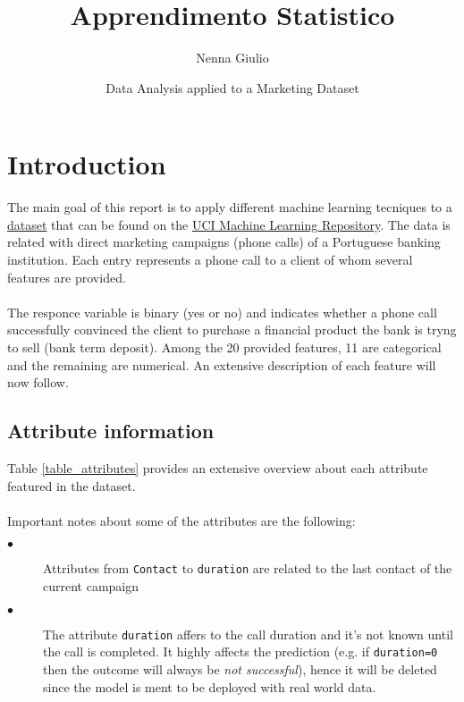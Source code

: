 \documentclass{article}
\title{Apprendimento Statistico}
\author{Nenna Giulio}
\date{Data Analysis applied to a Marketing Dataset}
\numberwithin{equation}{section}
\theoremstyle{definition}
\theoremstyle{plain}
\theoremstyle{definition}
\theoremstyle{remark}
\begin{document}
\maketitle
\section{Introduction} 
The main goal of this report is to apply different machine learning tecniques to a \href{http://archive.ics.uci.edu/ml/datasets/Bank+Marketing}{dataset} that can be found on the \href{http://archive.ics.uci.edu/ml/index.php}{UCI Machine Learning Repository}. The data is related with direct marketing campaigns (phone calls) of a Portuguese banking institution. Each entry represents a phone call to a client of whom several features are provided. \\
\\
The responce variable is binary (yes or no) and indicates whether a phone call successfully convinced the client to purchase a financial product the bank is tryng to sell (bank term deposit). Among the 20 provided features, 11 are categorical and the remaining are numerical. An extensive description of each feature will now follow.

\subsection{Attribute information}
Table \ref{table_attributes} provides an extensive overview about each attribute featured in the dataset.
\\
\\
Important notes about some of the attributes are the following:
\begin{description}
  \item[$\bullet$] Attributes from \texttt{Contact} to \texttt{duration} are related to the last contact of the current campaign
  \item[$\bullet$ ] The attribute \texttt{duration} affers to the call duration and it's not known until the call is completed. It highly affects the prediction (e.g. if \texttt{duration=0} then the outcome will always be \textit{not successful}), hence it will be deleted since the model is ment to be deployed with real world data.  
\end{description}
\end{document}
